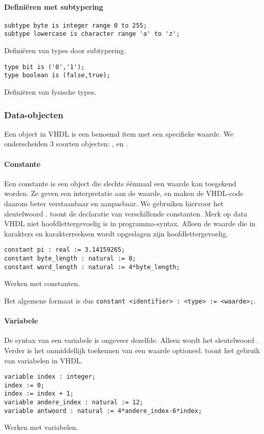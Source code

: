 \begin{vhdlcode}[hbt]
\paragraph{Defini\"eren met subtypering}
\begin{lstlisting}
subtype byte is integer range 0 to 255;
subtype lowercase is character range 'a' to 'z';
\end{lstlisting}
\caption{Defini\"eren van types door subtypering.}
\label{lst:constante}
\end{vhdlcode}

\begin{vhdlcode}[hbt]
\begin{lstlisting}
type bit is ('0','1');
type boolean is (false,true);
\end{lstlisting}
\caption{Defini\"eren van fysische types.}
\label{lst:constante}
\end{vhdlcode}
\subsubsection{Data-objecten}
Een object in VHDL is een benoemd item met een specifieke waarde. We onderscheiden 3 soorten objecten: ,  en .
\paragraph{Constante}Een constante is een object die slechts \'e\'enmaal een waarde kan toegekend worden. Ze geven een interpretatie aan de waarde, en maken de VHDL-code daarom beter verstaanbaar en aanpasbaar. We gebruiken hiervoor het sleutelwoord .  toont de declaratie van verschillende constanten. Merk op data VHDL niet hoofdlettergevoelig is in programma-syntax. Alleen de waarde die in karakters en karakterreeksen wordt opgeslagen zijn hoofdlettergevoelig.
\begin{vhdlcode}[hbt]
\begin{lstlisting}
constant pi : real := 3.14159265;
constant byte_length : natural := 8;
constant word_length : natural := 4*byte_length;
\end{lstlisting}
\caption{Werken met constanten.}
\label{lst:constante}
\end{vhdlcode}
Het algemene formaat is dus \verb+constant <identifier> : <type> := <waarde>;+.
\paragraph{Variabele}De syntax van een variabele is ongeveer dezelfde. Alleen wordt het sleutelwoord . Verder is het onmiddellijk toekennen van een waarde optioneel.  toont het gebruik van variabelen in VHDL.
\begin{vhdlcode}[hbt]
\begin{lstlisting}
variable index : integer;
index := 0;
index := index + 1;
variable andere_index : natural := 12;
variable antwoord : natural := 4*andere_index-6*index;
\end{lstlisting}
\caption{Werken met variabelen.}
\label{lst:variabele}
\end{vhdlcode}
